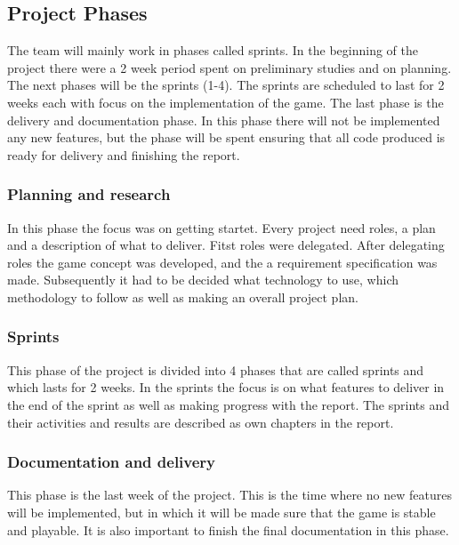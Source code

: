 \clearpage
\subsection{Project Phases}

The team will mainly work in phases called sprints. In the beginning of the project there were a 2 week period spent on preliminary studies and on planning. The next phases will be the sprints (1-4). The sprints are scheduled to last for 2 weeks each with focus on the implementation of the game. The last phase is the delivery and documentation phase. In this phase there will not be implemented any new features, but the phase will be spent ensuring that all code produced is ready for delivery and finishing the report.

\subsubsection{Planning and research}
In this phase the focus was on getting startet. Every project need roles, a plan and a description of what to deliver. Fitst roles were delegated. After delegating roles the game concept was developed, and the a requirement specification was made. Subsequently it had to be decided what technology to use, which methodology to follow as well as making an overall project plan. 

\subsubsection{Sprints}
This phase of the project is divided into 4 phases that are called sprints and which lasts for 2 weeks. In the sprints the focus is on what features to deliver in the end of the sprint as well as making progress with the report. The sprints and their activities and results are described as own chapters in the report.

\subsubsection{Documentation and delivery}
This phase is the last week of the project. This is the time where no new features will be implemented, but in which it will be made sure that the game is stable and playable. It is also important to finish the final documentation in this phase.
